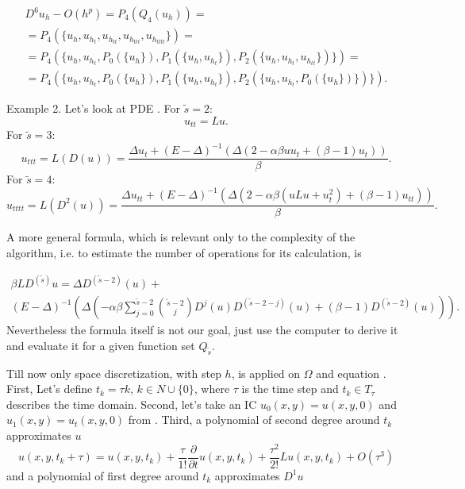 \documentclass[11pt,a4paper,twoside]{article}
\begin{document}
\begin{align*} 
D^6 u_h - O(h^p) = P_4(Q_4(u_h)) =
\\
= P_4(\{u_{ h}, u_{ h_{t} }, u_{ h_{tt} }, u_{ h_{ttt} }, u_{ h_{tttt} } \}) = 
\\
= P_4(\{u_{ h}, u_{ h_{t} }, P_0(\{u_h\}),  P_1( \{ u_h, u_{ h_{t} } \} ), P_2( \{ u_h, u_{ h_{t} }, u_{ h_{tt} } \} )  \}) = 
\\ 
= P_4(\{u_{ h}, u_{ h_{t} }, P_0(\{u_h\}),  P_1( \{ u_h, u_{ h_{t} } \} ), P_2( \{ u_h, u_{ h_{t} },  P_0( \{ u_h \} ) \} )  \}).
\end{align*}

Example 2. Let's look at PDE . For $\tilde s = 2$:
$$
u_{tt} = Lu.
$$
For $\tilde s = 3$:
$$
u_{ttt} = L(D(u)) = \frac{ \Delta u_t + (E - \Delta)^{-1}           ( \Delta (2 -\alpha \beta u u_t  +                          (\beta -1)u_t) )  }{\beta}.
$$
For $\tilde s = 4$:
$$
u_{tttt} = L(D^2(u)) = \frac{ \Delta u_{tt} + (E - \Delta)^{-1}( \Delta (2 -\alpha \beta ( u Lu +  u_t^2 )   + (\beta -1) u_{tt} ) )  }{\beta}.
$$

A more general formula, which is relevant only to the complexity of the algorithm, i.e. to estimate the number of operations for its calculation, is

\begin{align*}
\beta LD^{(\tilde s)} u =   \Delta D^{ (\tilde s - 2) }(u)  +
\\
 (E - \Delta)^{-1}( \Delta ( -\alpha \beta \sum_{j=0}^{ \tilde s - 2}  { \tilde s - 2\choose j} D^j(u) D^{ (\tilde s - 2 - j) }(u)+ (\beta -1) D^{ (\tilde s - 2) }(u) ) ).
\end{align*}
Nevertheless the formula itself is not our goal, just use the computer to derive it and evaluate it for a given function set $Q_{\tilde s}$.
\fi


Till now only space discretization, with step $h$, is applied on $\Omega$ and equation . First, Let's define $t_k = \tau k$, $k \in N \cup \{0\}$, where $\tau$ is the time step and $t_k \in T_{\tau}$ describes the time domain. Second, let's take an IC $u_0(x,y) = u(x,y,0)$ and $u_1(x,y) = u_t(x,y,0)$ from \cite{EllipticProblem}. Third, 
a polynomial of second degree around $t_k$ approximates $u$
\begin{equation}\label{taylor21}
u(x,y,t_k+\tau) = u(x,y,t_k) + \frac{\tau } {1!} \frac{ \partial }{ \partial t } u(x,y,t_k ) + \frac{ \tau^2 } { 2! }Lu(x,y,t_k ) + O(\tau^3)
\end{equation}
and a polynomial of first degree around $t_k$ approximates $D^1u$
\end{document}
